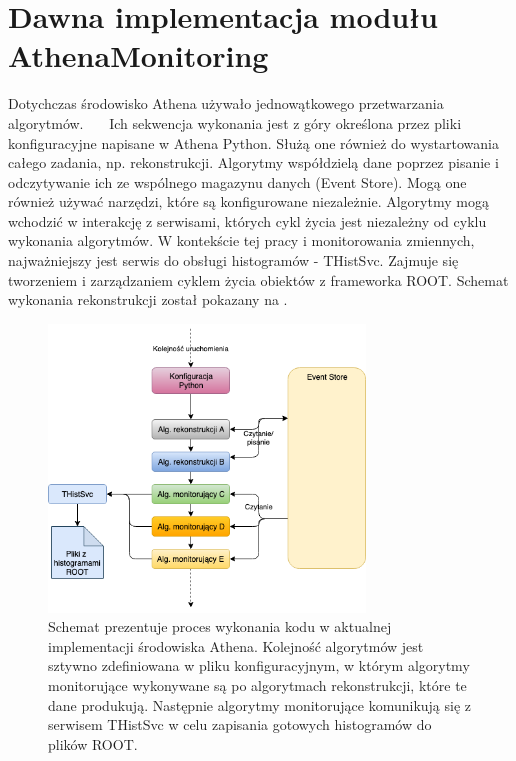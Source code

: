 \section{Dawna implementacja modułu AthenaMonitoring}
Dotychczas środowisko Athena używało jednowątkowego przetwarzania algorytmów.~\cite{tbold-hab-thesis}~\cite{tbold-summary}~\cite{atlas-multithread-presentation}
Ich sekwencja wykonania jest z góry określona przez pliki konfiguracyjne napisane w Athena Python. 
Służą one również do wystartowania całego zadania, np. rekonstrukcji. 
Algorytmy współdzielą dane poprzez pisanie i odczytywanie ich ze wspólnego magazynu danych (Event Store). 
Mogą one również używać narzędzi, które są konfigurowane niezależnie. 
Algorytmy mogą wchodzić w interakcję z serwisami, których cykl życia jest niezależny od cyklu wykonania algorytmów.
W kontekście tej pracy i monitorowania zmiennych, najważniejszy jest serwis do obsługi histogramów - THistSvc.
Zajmuje się tworzeniem i zarządzaniem cyklem życia obiektów z frameworka ROOT.
Schemat wykonania rekonstrukcji został pokazany na .

\begin{figure}[!ht]
\centering
\includegraphics[width=0.75\textwidth]{img/old_flow.png}
\caption{
Schemat prezentuje proces wykonania kodu w aktualnej implementacji środowiska Athena. 
Kolejność algorytmów jest sztywno zdefiniowana w pliku konfiguracyjnym, w którym algorytmy monitorujące wykonywane są po algorytmach rekonstrukcji, które te dane produkują. 
Następnie algorytmy monitorujące komunikują się z serwisem THistSvc w celu zapisania gotowych histogramów do plików ROOT.
}
\label{fig:athena:oldFlow}
\end{figure}

